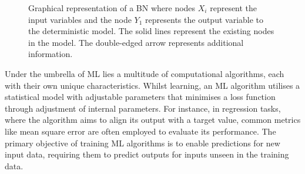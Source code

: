 \documentclass[journal]{IEEEtran}
\begin{document}
\begin{figure}[t]
    \caption{\small Graphical representation of a BN where nodes $X_i$ represent the input variables and the node $Y_1$ represents the output variable to the deterministic model. The solid lines represent the existing nodes in the model. The double-edged arrow represents additional information.}\label{fig:BN3} 
\end{figure}

Under the umbrella of ML lies a multitude of computational algorithms, each with their own unique characteristics. Whilst learning, an ML algorithm utilises a statistical model with adjustable parameters that minimises a loss function through adjustment of internal parameters. For instance, in regression tasks, where the algorithm aims to align its output with a target value, common metrics like mean square error are often employed to evaluate its performance. The primary objective of training ML algorithms is to enable predictions for new input data, requiring them to predict outputs for inputs unseen in the training data.
\end{document}
